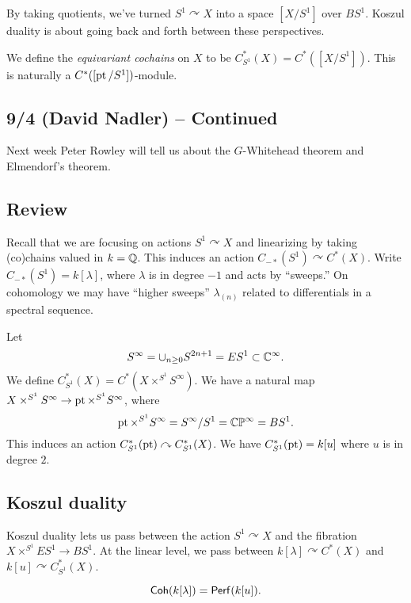 \documentclass{article}
\begin{document}
By taking quotients, we've turned $S^1 \curvearrowright X$ into a space $[X / S^1]$ over $BS^1$.
Koszul duality is about going back and forth between these perspectives.

\begin{dfn}
  We define the \emph{equivariant cochains} on $X$ to be $C^*_{S^1}(X) = C^*([X / S^1])$.
  This is naturally a $C^*([\operatorname{pt} / S^1])$-module.
\end{dfn}

\subsection{9/4 (David Nadler) -- Continued}

Next week Peter Rowley will tell us about the $G$-Whitehead theorem and Elmendorf's theorem.

\subsection{Review}

Recall that we are focusing on actions $S^1 \curvearrowright X$ and linearizing by taking (co)chains valued in $k = \mathbb{Q}$.
This induces an action $C_{-*}(S^1) \curvearrowright C^*(X)$.
Write $C_{-*}(S^1) = k[\lambda]$, where $\lambda$ is in degree $-1$ and acts by ``sweeps.''
On cohomology we may have ``higher sweeps'' $\lambda_{(n)}$ related to differentials in a spectral sequence.

Let
\[
  S^\infty = \cup_{n \geq 0} S^{2n+1} = ES^1 \subset \mathbb{C}^\infty.
\]
We define $C^*_{S^1}(X) = C^*(X \times^{S^1} S^\infty)$.
We have a natural map $X \times^{S^1} S^\infty \to \operatorname{pt} \times^{S^1} S^\infty$, where
\[
  \operatorname{pt} \times^{S^1} S^\infty = S^\infty / S^1 = \mathbb{C}\mathbb{P}^\infty = BS^1.
\]
This induces an action $C^*_{S^1}(\operatorname{pt}) \curvearrowright C^*_{S^1}(X)$.
We have $C^*_{S^1}(\operatorname{pt}) = k[u]$ where $u$ is in degree $2$.

\subsection{Koszul duality}

Koszul duality lets us pass between the action $S^1 \curvearrowright X$ and the fibration $X \times^{S^1} ES^1 \to BS^1$.
At the linear level, we pass between $k[\lambda] \curvearrowright C^*(X)$ and $k[u] \curvearrowright C^*_{S^1}(X)$.

\begin{thm}
  \[
    \mathsf{Coh}(k[\lambda]) = \mathsf{Perf}(k[u]).
  \]
\end{thm}
\end{document}

